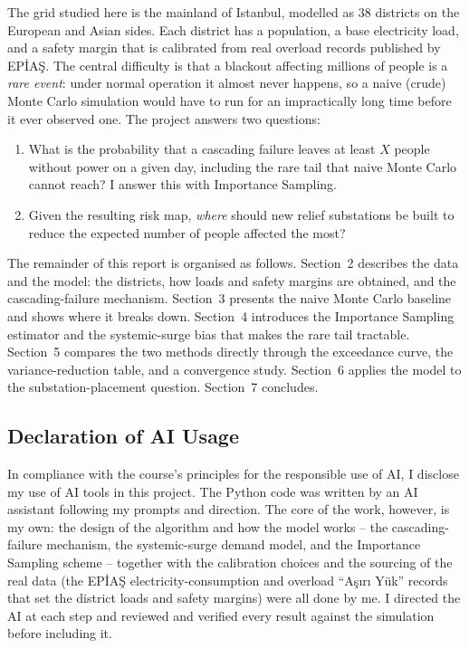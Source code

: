 \documentclass[11pt,a4paper]{article}
\begin{document}
The grid studied here is the mainland of Istanbul, modelled as 38 districts on
the European and Asian sides. Each district has a population, a base
electricity load, and a safety margin that is calibrated from real overload
records published by EPİAŞ. The central difficulty is that a blackout affecting
millions of people is a \emph{rare event}: under normal operation it almost never
happens, so a naive (crude) Monte Carlo simulation would have to run for an
impractically long time before it ever observed one. The project answers two
questions:

\begin{enumerate}
    \item What is the probability that a cascading failure leaves at least $X$
    people without power on a given day, including the rare tail that naive
    Monte Carlo cannot reach? I answer this with Importance Sampling.
    \item Given the resulting risk map, \emph{where} should new relief
    substations be built to reduce the expected number of people affected the
    most?
\end{enumerate}

The remainder of this report is organised as follows. Section~2 describes the
data and the model: the districts, how loads and safety margins are obtained,
and the cascading-failure mechanism. Section~3 presents the naive Monte Carlo
baseline and shows where it breaks down. Section~4 introduces the Importance
Sampling estimator and the systemic-surge bias that makes the rare tail
tractable. Section~5 compares the two methods directly through the exceedance
curve, the variance-reduction table, and a convergence study. Section~6 applies
the model to the substation-placement question. Section~7 concludes.

\subsection*{Declaration of AI Usage}

In compliance with the course's principles for the responsible use of AI, I
disclose my use of AI tools in this project. The Python code was written by an AI
assistant following my prompts and direction. The core of the work, however, is
my own: the design of the algorithm and how the model works -- the
cascading-failure mechanism, the systemic-surge demand model, and the Importance
Sampling scheme -- together with the calibration choices and the sourcing of the
real data (the EPİAŞ electricity-consumption and overload ``Aşırı Yük'' records
that set the district loads and safety margins) were all done by me. I directed
the AI at each step and reviewed and verified every result against the
simulation before including it.
\end{document}

